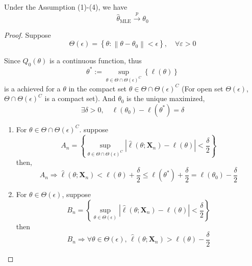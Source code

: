 \begin{theorem}
	Under the Assumption (1)-(4), we have
	\begin{equation}
		\hat{\theta}_{\text{MLE}}\stackrel{p}{\rightarrow}\theta_{0}
	\end{equation}
\end{theorem}

\begin{proof}
	Suppose
	\begin{equation*}
		\Theta(\epsilon)=\left\{\theta:\left\|\theta-\theta_{0}\right\|<\epsilon\right\},\quad\forall\varepsilon>0
	\end{equation*}

	Since $Q_{0}(\theta)$ is a continuous function, thus
	\begin{equation*}
		\theta^{*}:=\sup_{\theta\in\Theta\cap \Theta(\epsilon)^{C}}\left\{\ell(\theta)\right\}
	\end{equation*}
	is a achieved for a $\theta$ in the compact set $\theta\in\Theta\cap \Theta(\epsilon)^{C}$ (For open set $\Theta(\epsilon)$, $\Theta\cap\Theta(\epsilon)^{C}$ is a compact set). And $\theta_{0}$ is the unique maximized,
	\begin{equation*}
		\exists\delta>0,\quad\ell\left(\theta_{0}\right)-\ell\left(\theta^{*}\right)=\delta
	\end{equation*}

	\begin{enumerate}
		\item For $\theta\in\Theta\cap\Theta(\epsilon)^{C}$. suppose
		      \begin{equation}
			      A_{n}=\left\{\sup_{\theta\in\Theta\cap\Theta(\epsilon)^{C}}\left|\hat{\ell}\left(\theta;\textbf{X}_{n}\right)-\ell(\theta)\right|<\frac{\delta}{2}\right\}
		      \end{equation}
		      then,
		      \begin{equation}
			      A_{n}\Longrightarrow\hat{\ell}\left(\theta;\textbf{X}_{n}\right)<\ell(\theta)+\frac{\delta}{2}\leq \ell\left(\theta^{*}\right)+\frac{\delta}{2}=\ell\left(\theta_{0}\right)-\frac{\delta}{2}
		      \end{equation}
		\item For $\theta\in\Theta(\epsilon)$, suppose
		      \begin{equation}
			      B_{n}=\left\{\sup_{\theta\in\Theta(\epsilon)}\left|\hat{\ell}\left(\theta;\mathbf{X}_{n}\right)-\ell(\theta)\right|<\frac{\delta}{2}\right\}
		      \end{equation}
		      then
		      \begin{equation}
			      B_{n}\Longrightarrow\forall\theta\in\Theta(\epsilon),\,\hat{\ell}\left(\theta;\mathbf{X}_{n}\right)>\ell(\theta)-\frac{\delta}{2}
		      \end{equation}
	\end{enumerate}


\end{proof}
